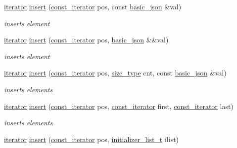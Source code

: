 \begin{DoxyCompactItemize}
\hyperlink{classnlohmann_1_1basic__json_a099316232c76c034030a38faa6e34dca}{iterator} \hyperlink{classnlohmann_1_1basic__json_a0136728f5db69d4051c77b94307abd6c}{insert} (\hyperlink{classnlohmann_1_1basic__json_a41a70cf9993951836d129bb1c2b3126a}{const\+\_\+iterator} pos, const \hyperlink{classnlohmann_1_1basic__json}{basic\+\_\+json} \&val)
\begin{DoxyCompactList}\small\item\em inserts element \end{DoxyCompactList}\item 
\hyperlink{classnlohmann_1_1basic__json_a099316232c76c034030a38faa6e34dca}{iterator} \hyperlink{classnlohmann_1_1basic__json_a1ecce113ff11dd294689ee4d45cbb855}{insert} (\hyperlink{classnlohmann_1_1basic__json_a41a70cf9993951836d129bb1c2b3126a}{const\+\_\+iterator} pos, \hyperlink{classnlohmann_1_1basic__json}{basic\+\_\+json} \&\&val)
\begin{DoxyCompactList}\small\item\em inserts element \end{DoxyCompactList}\item 
\hyperlink{classnlohmann_1_1basic__json_a099316232c76c034030a38faa6e34dca}{iterator} \hyperlink{classnlohmann_1_1basic__json_a30a7cc24f2931c20ecae37ec4a5e901f}{insert} (\hyperlink{classnlohmann_1_1basic__json_a41a70cf9993951836d129bb1c2b3126a}{const\+\_\+iterator} pos, \hyperlink{classnlohmann_1_1basic__json_a39f2cd0b58106097e0e67bf185cc519b}{size\+\_\+type} cnt, const \hyperlink{classnlohmann_1_1basic__json}{basic\+\_\+json} \&val)
\begin{DoxyCompactList}\small\item\em inserts elements \end{DoxyCompactList}\item 
\hyperlink{classnlohmann_1_1basic__json_a099316232c76c034030a38faa6e34dca}{iterator} \hyperlink{classnlohmann_1_1basic__json_a404cfe1bdbf1dc6b229627fcf2afb95f}{insert} (\hyperlink{classnlohmann_1_1basic__json_a41a70cf9993951836d129bb1c2b3126a}{const\+\_\+iterator} pos, \hyperlink{classnlohmann_1_1basic__json_a41a70cf9993951836d129bb1c2b3126a}{const\+\_\+iterator} first, \hyperlink{classnlohmann_1_1basic__json_a41a70cf9993951836d129bb1c2b3126a}{const\+\_\+iterator} last)
\begin{DoxyCompactList}\small\item\em inserts elements \end{DoxyCompactList}\item 
\hyperlink{classnlohmann_1_1basic__json_a099316232c76c034030a38faa6e34dca}{iterator} \hyperlink{classnlohmann_1_1basic__json_aa19b9b9ca6967295b102f1cc487b1ad7}{insert} (\hyperlink{classnlohmann_1_1basic__json_a41a70cf9993951836d129bb1c2b3126a}{const\+\_\+iterator} pos, \hyperlink{classnlohmann_1_1basic__json_a670f6a0eb3d1e0ffd00c27d35472ccc9}{initializer\+\_\+list\+\_\+t} ilist)

\end{DoxyCompactItemize}
